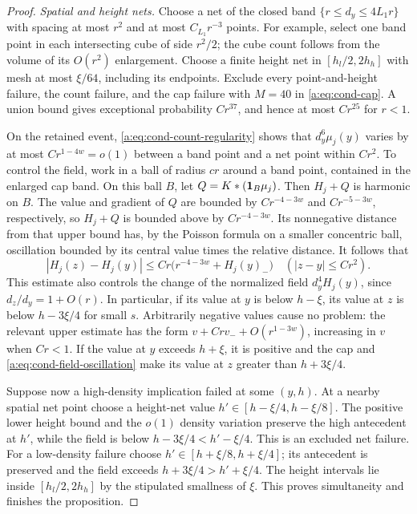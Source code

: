 \begin{proof}
\emph{Spatial and height nets.}
Choose a net of the closed band $\{r\le d_y\le4L_1r\}$ with
spacing at most $r^2$ and at most $C_{L_1}r^{-3}$ points. For
example, select one band point in each intersecting cube of side
$r^2/2$; the cube count follows from the volume of its $O(r^2)$
enlargement. Choose a finite height net in $[h_l/2,2h_h]$ with
mesh at most $\xi/64$, including its endpoints. Exclude every
point-and-height failure, the count failure, and the cap failure
with $M=40$ in \eqref{a:eq:cond-cap}. A union bound gives exceptional
probability $Cr^{37}$, and hence at most $Cr^{25}$ for $r<1$.

On the retained event, \eqref{a:eq:cond-count-regularity} shows that
$d_y^6\mu_j(y)$ varies by at most $Cr^{1-4w}=o(1)$ between a
band point and a net point within $Cr^2$. To control the field,
work in a ball of radius $cr$ around a band point, contained in
the enlarged cap band. On this ball $B$, let
$Q=K*(\mathbf 1_B\mu_j)$. Then $H_j+Q$ is harmonic on $B$.
The value and gradient of $Q$ are bounded by
$Cr^{-4-3w}$ and $Cr^{-5-3w}$, respectively, so $H_j+Q$ is
bounded above by $Cr^{-4-3w}$. Its nonnegative distance from that
upper bound has, by the Poisson formula on a smaller concentric
ball, oscillation bounded by its central value times the relative
distance. It follows that
\begin{equation}\label{a:eq:cond-field-oscillation}
 |H_j(z)-H_j(y)|
   \le Cr\big(r^{-4-3w}+H_j(y)_-\big)
       \quad(|z-y|\le Cr^2).
\end{equation}
This estimate also controls the change of the normalized field
$d_y^4H_j(y)$, since $d_z/d_y=1+O(r)$. In particular, if its
value at $y$ is below $h-\xi$, its value at $z$ is below
$h-3\xi/4$ for small $s$. Arbitrarily negative values cause no
problem: the relevant upper estimate has the form
$v+Crv_-+O(r^{1-3w})$, increasing in $v$ when $Cr<1$.
If the value at $y$ exceeds $h+\xi$, it is positive and the cap
and \eqref{a:eq:cond-field-oscillation} make its value at $z$
greater than $h+3\xi/4$.

Suppose now a high-density implication failed at some $(y,h)$.
At a nearby spatial net point choose a height-net value
$h'\in[h-\xi/4,h-\xi/8]$. The positive lower height bound and
the $o(1)$ density variation preserve the high antecedent at
$h'$, while the field is below $h-3\xi/4<h'-\xi/4$.
This is an excluded net failure. For a low-density failure choose
$h'\in[h+\xi/8,h+\xi/4]$; its antecedent is preserved and the
field exceeds $h+3\xi/4>h'+\xi/4$. The height intervals lie
inside $[h_l/2,2h_h]$ by the stipulated smallness of $\xi$.
This proves simultaneity and finishes the proposition.
\end{proof}

